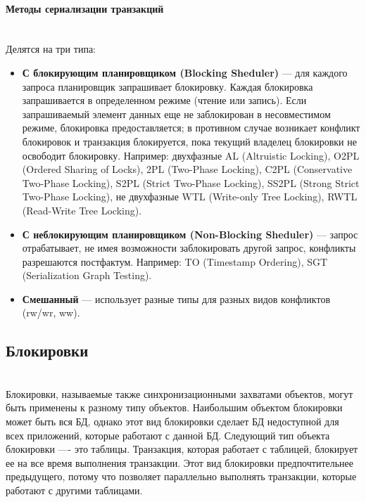 \paragraph{Методы сериализации транзакций} ~\\

Делятся на три типа:

\begin{itemize}
    \item 
        \textbf{С блокирующим планировщиком (Blocking Sheduler)} — для каждого запроса планировщик запрашивает блокировку. Каждая блокировка запрашивается в определенном режиме (чтение или запись). Если запрашиваемый элемент данных еще не заблокирован в несовместимом режиме, блокировка предоставляется; в противном случае возникает конфликт блокировок и транзакция блокируется, пока текущий владелец блокировки не освободит блокировку. Например: двухфазные AL (Altruistic Locking), O2PL (Ordered Sharing of Locks), 2PL (Two-Phase Locking), C2PL (Conservative Two-Phase Locking), S2PL (Strict Two-Phase Locking), SS2PL (Strong Strict Two-Phase Locking), не двухфазные WTL (Write-only Tree Locking), RWTL (Read-Write Tree Locking).
    \item 
        \textbf{С неблокирующим планировщиком (Non-Blocking Sheduler)} — запрос отрабатывает, не имея возможности заблокировать другой запрос, конфликты разрешаются постфактум. Например: TO (Timestamp Ordering), SGT (Serialization Graph Testing).
    \item 
        \textbf{Смешанный} — использует разные типы для разных видов конфликтов (rw/wr, ww).\autocite{TransactionalInformationSystems}
\end{itemize}

\subsection{Блокировки} ~\\

Блокировки, называемые также синхронизационными захватами объектов, могут быть применены к разному типу объектов. Наибольшим объектом блокировки может быть вся БД, однако этот вид блокировки сделает БД недоступной для всех приложений, которые работают с данной БД. Следующий тип объекта блокировки —- это таблицы. Транзакция, которая работает с таблицей, блокирует ее на все время выполнения транзакции. Этот вид блокировки предпочтительнее предыдущего, потому что позволяет параллельно выполнять транзакции, которые работают с другими таблицами.


